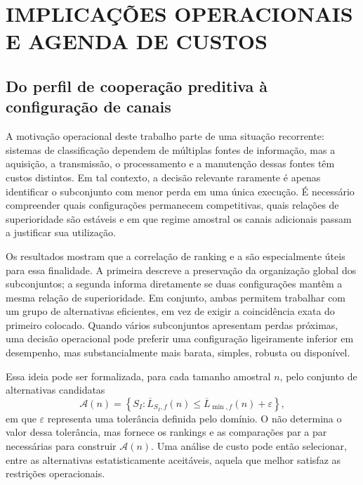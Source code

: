 
\chapter{IMPLICAÇÕES OPERACIONAIS E AGENDA DE CUSTOS}
\label{chap:implicacoes}

\section{Do perfil de cooperação preditiva à configuração de canais}

A motivação operacional deste trabalho parte de uma situação recorrente: sistemas de classificação dependem de múltiplas fontes de informação, mas a aquisição, a transmissão, o processamento e a manutenção dessas fontes têm custos distintos. Em tal contexto, a decisão relevante raramente é apenas identificar o subconjunto com menor perda em uma única execução. É necessário compreender quais configurações permanecem competitivas, quais relações de superioridade são estáveis e em que regime amostral os canais adicionais passam a justificar sua utilização.

Os resultados mostram que a correlação de ranking e a \WinnersAgreement{} são especialmente úteis para essa finalidade. A primeira descreve a preservação da organização global dos subconjuntos; a segunda informa diretamente se duas configurações mantêm a mesma relação de superioridade. Em conjunto, ambas permitem trabalhar com um grupo de alternativas eficientes, em vez de exigir a coincidência exata do primeiro colocado. Quando vários subconjuntos apresentam perdas próximas, uma decisão operacional pode preferir uma configuração ligeiramente inferior em desempenho, mas substancialmente mais barata, simples, robusta ou disponível.

Essa ideia pode ser formalizada, para cada tamanho amostral $n$, pelo conjunto de alternativas candidatas
\[
\mathcal{A}(n)=\left\{S_I:\overline{L}_{S_I,f}(n)\leq
\overline{L}_{\min,f}(n)+\varepsilon\right\},
\]
em que $\varepsilon$ representa uma tolerância definida pelo domínio. O \CoInfoSim{} não determina o valor dessa tolerância, mas fornece os rankings e as comparações par a par necessárias para construir $\mathcal{A}(n)$. Uma análise de custo pode então selecionar, entre as alternativas estatisticamente aceitáveis, aquela que melhor satisfaz as restrições operacionais.

